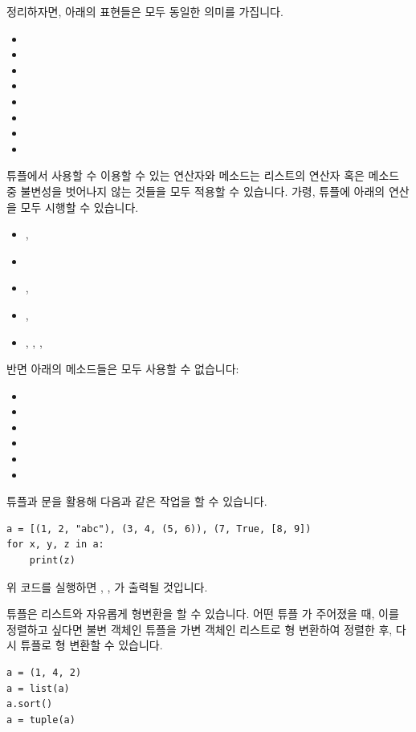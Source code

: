 \documentclass[../main.tex]{subfiles}
\begin{document}
정리하자면, 아래의 표현들은 모두 동일한 의미를 가집니다.
\begin{itemize}
    \item {}
    \item {}
    \item {}
    \item {}
    \item {}
    \item {}
    \item {}
    \item {}
\end{itemize}

튜플에서 사용할 수 이용할 수 있는 연산자와 메소드는 리스트의 연산자 혹은 메소드 중 불변성을 벗어나지 않는 것들을 모두 적용할 수 있습니다.
가령, 튜플에 아래의 연산을 모두 시행할 수 있습니다.
\begin{itemize}
    \item \pyin{+}, \pyin{*}
    \item {}
    \item {}, 
    \item \pyin{==}, 
    \item {}, , , 
\end{itemize}
반면 아래의 메소드들은 모두 사용할 수 없습니다:
\begin{itemize}
    \item {}
    \item {}
    \item {}
    \item {}
    \item {}
    \item {}
\end{itemize}

튜플과 문을 활용해 다음과 같은 작업을 할 수 있습니다.
\begin{verbatim}
a = [(1, 2, "abc"), (3, 4, (5, 6)), (7, True, [8, 9])
for x, y, z in a:
    print(z)
\end{verbatim}
위 코드를 실행하면 , , \pyin{[8, 9]}가 출력될 것입니다.

튜플은 리스트와 자유롭게 형변환을 할 수 있습니다.
어떤 튜플 가 주어졌을 때, 이를 정렬하고 싶다면 불변 객체인 튜플을 가변 객체인 리스트로 형 변환하여 정렬한 후, 다시 튜플로 형 변환할 수 있습니다.
\begin{verbatim}
a = (1, 4, 2)
a = list(a)
a.sort()
a = tuple(a)
\end{verbatim}
\end{document}
